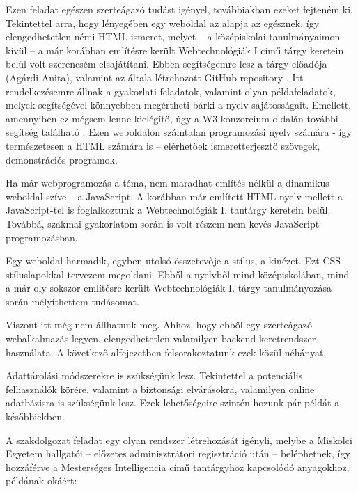 

Ezen feladat egészen szerteágazó tudást igényel, továbbiakban ezeket fejteném ki. Tekintettel arra, hogy lényegében egy weboldal az alapja az egésznek, így elengedhetetlen némi HTML ismeret, melyet – a középiskolai tanulmányaimon kívül – a már korábban említésre került Webtechnológiák I című tárgy keretein belül volt szerencsém elsajátítani. Ebben segítségemre lesz a tárgy előadója (Agárdi Anita), valamint az általa létrehozott GitHub repository \cite{webtechgithub}. Itt rendelkezésemre állnak a gyakorlati feladatok, valamint olyan példafeladatok, melyek segítségével könnyebben megértheti bárki a nyelv sajátosságait. Emellett, amennyiben ez mégsem lenne kielégítő, úgy a W3 konzorcium oldalán további segítség található \cite{w3schools}. Ezen weboldalon számtalan programozási nyelv számára - így természetesen a HTML számára is – elérhetőek ismeretterjesztő szövegek, demonstrációs programok.

Ha már webprogramozás a téma, nem maradhat említés nélkül a dinamikus weboldal szíve – a JavaScript. A korábban már említett HTML nyelv mellett a JavaScript-tel is foglalkoztunk a Webtechnológiák I. tantárgy keretein belül. Továbbá, szakmai gyakorlatom során is volt részem nem kevés JavaScript programozásban.

Egy weboldal harmadik, egyben utolsó összetevője a stílus, a kinézet. Ezt CSS stíluslapokkal tervezem megoldani. Ebből a nyelvből mind középiskolában, mind a már oly sokszor említésre került Webtechnológiák I. tárgy tanulmányozása során mélyíthettem tudásomat.

Viszont itt még nem állhatunk meg. Ahhoz, hogy ebből egy szerteágazó webalkalmazás legyen, elengedhetetlen valamilyen backend keretrendszer használata. A következő alfejezetben felsorakoztatunk ezek közül néhányat.

Adattárolási módszerekre is szükségünk lesz. Tekintettel a potenciális felhasználók körére, valamint a biztonsági elvárásokra, valamilyen online adatbázisra is szükségünk lesz. Ezek lehetőségeire szintén hozunk pár példát a későbbiekben.


A szakdolgozat feladat egy olyan rendszer létrehozását igényli, melybe a Miskolci Egyetem hallgatói – előzetes adminisztrátori regisztráció után – beléphetnek, így hozzáférve a Mesterséges Intelligencia című tantárgyhoz kapcsolódó anyagokhoz, példának okáért:

